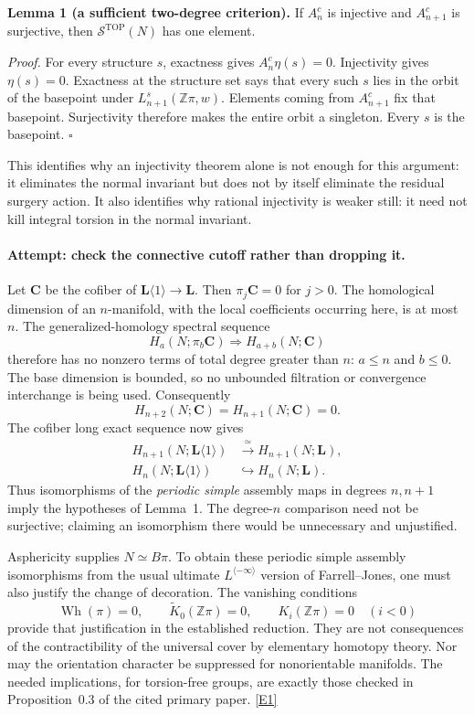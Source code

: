 \documentclass[11pt,a4paper]{article}
\newcommand{\Z}{\mathbb{Z}}
\newcommand{\eref}[2]{\hyperlink{extra:#1:#2}{[E#2]}}
\numberwithin{equation}{section}
\begin{document}
\textbf{Lemma 1 (a sufficient two-degree criterion).}
If $A^c_n$ is injective and $A^c_{n+1}$ is surjective, then
$\mathcal S^{\mathrm{TOP}}(N)$ has one element.

\emph{Proof.} For every structure $s$, exactness gives
$A^c_n\eta(s)=0$. Injectivity gives $\eta(s)=0$. Exactness at the
structure set says that every such $s$ lies in the orbit of the basepoint
under $L^s_{n+1}(\Z\pi,w)$. Elements coming from $A^c_{n+1}$ fix that
basepoint. Surjectivity therefore makes the entire orbit a singleton.
Every $s$ is the basepoint. $\square$

This identifies why an injectivity theorem alone is not enough for this
argument: it eliminates the normal invariant but does not by itself
eliminate the residual surgery action. It also identifies why rational
injectivity is weaker still: it need not kill integral torsion in the
normal invariant.

\paragraph{Attempt: check the connective cutoff rather than dropping it.}
Let $\mathbf C$ be the cofiber of
$\mathbf L\langle1\rangle\to\mathbf L$. Then
$\pi_j\mathbf C=0$ for $j>0$. The homological dimension of an
$n$-manifold, with the local coefficients occurring here, is at most $n$.
The generalized-homology spectral sequence
\[
 H_a(N;\pi_b\mathbf C)\Longrightarrow H_{a+b}(N;\mathbf C)
\]
therefore has no nonzero terms of total degree greater than $n$:
$a\leq n$ and $b\leq0$. The base dimension is bounded, so no unbounded
filtration or convergence interchange is being used. Consequently
\[
 H_{n+2}(N;\mathbf C)=H_{n+1}(N;\mathbf C)=0.
\]
The cofiber long exact sequence now gives
\begin{equation}\label{eq:statement:comparison}
\begin{aligned}
 H_{n+1}(N;\mathbf L\langle1\rangle)&\xrightarrow{\ \simeq\ }
 H_{n+1}(N;\mathbf L),\\
 H_n(N;\mathbf L\langle1\rangle)&\hookrightarrow H_n(N;\mathbf L).
\end{aligned}
\end{equation}
Thus isomorphisms of the \emph{periodic simple} assembly maps in degrees
$n,n+1$ imply the hypotheses of Lemma~1. The degree-$n$ comparison need
not be surjective; claiming an isomorphism there would be unnecessary
and unjustified.

Asphericity supplies $N\simeq B\pi$. To obtain these periodic simple
assembly isomorphisms from the usual ultimate $L^{\langle-\infty\rangle}$
version of Farrell--Jones, one must also justify the change of decoration.
The vanishing conditions
\[
 \operatorname{Wh}(\pi)=0,\qquad
 \widetilde K_0(\Z\pi)=0,\qquad K_i(\Z\pi)=0\quad(i<0)
\]
provide that justification in the established reduction. They are not
consequences of the contractibility of the universal cover by elementary
homotopy theory. Nor may the orientation character be suppressed for
nonorientable manifolds. The needed implications, for torsion-free groups,
are exactly those checked in Proposition~0.3 of the cited primary paper.
\eref{statement}{1}
\end{document}

